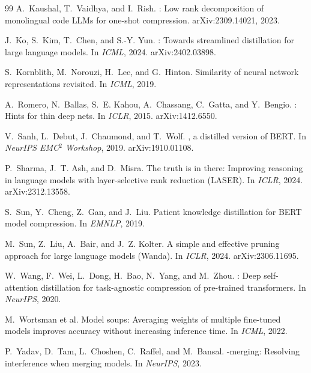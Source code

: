 \documentclass{article}
\begin{document}
\begin{thebibliography}{99}
A.~Kaushal, T.~Vaidhya, and I.~Rish.
: Low rank decomposition of monolingual code {LLMs} for one-shot compression.
\newblock arXiv:2309.14021, 2023.

J.~Ko, S.~Kim, T.~Chen, and S.-Y. Yun.
: Towards streamlined distillation for large language models.
\newblock In \emph{ICML}, 2024. arXiv:2402.03898.

S.~Kornblith, M.~Norouzi, H.~Lee, and G.~Hinton.
\newblock Similarity of neural network representations revisited.
\newblock In \emph{ICML}, 2019.

A.~Romero, N.~Ballas, S.~E. Kahou, A.~Chassang, C.~Gatta, and Y.~Bengio.
: Hints for thin deep nets.
\newblock In \emph{ICLR}, 2015. arXiv:1412.6550.

V.~Sanh, L.~Debut, J.~Chaumond, and T.~Wolf.
, a distilled version of {BERT}.
\newblock In \emph{NeurIPS EMC$^2$ Workshop}, 2019. arXiv:1910.01108.

P.~Sharma, J.~T. Ash, and D.~Misra.
\newblock The truth is in there: Improving reasoning in language models with layer-selective rank reduction ({LASER}).
\newblock In \emph{ICLR}, 2024. arXiv:2312.13558.

S.~Sun, Y.~Cheng, Z.~Gan, and J.~Liu.
\newblock Patient knowledge distillation for {BERT} model compression.
\newblock In \emph{EMNLP}, 2019.

M.~Sun, Z.~Liu, A.~Bair, and J.~Z. Kolter.
\newblock A simple and effective pruning approach for large language models ({Wanda}).
\newblock In \emph{ICLR}, 2024. arXiv:2306.11695.

W.~Wang, F.~Wei, L.~Dong, H.~Bao, N.~Yang, and M.~Zhou.
: Deep self-attention distillation for task-agnostic compression of pre-trained transformers.
\newblock In \emph{NeurIPS}, 2020.

M.~Wortsman et al.
\newblock Model soups: Averaging weights of multiple fine-tuned models improves accuracy without increasing inference time.
\newblock In \emph{ICML}, 2022.

P.~Yadav, D.~Tam, L.~Choshen, C.~Raffel, and M.~Bansal.
-merging: Resolving interference when merging models.
\newblock In \emph{NeurIPS}, 2023.

\end{thebibliography}
\end{document}
